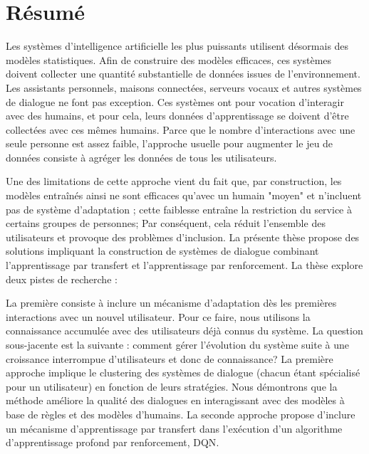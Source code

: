 \newpage

\section*{Résumé}

Les systèmes d'intelligence artificielle les plus puissants utilisent désormais des modèles statistiques. Afin de construire des modèles efficaces, ces systèmes doivent collecter une quantité substantielle de données issues de l’environnement. Les assistants personnels, maisons connectées, serveurs vocaux et autres systèmes de dialogue ne font pas exception. Ces systèmes ont pour vocation d'interagir avec des humains, et pour cela, leurs données d'apprentissage se doivent d'être collectées avec ces mêmes humains. Parce que le nombre d'interactions avec une seule personne est assez faible, l'approche usuelle pour augmenter le jeu de données consiste à agréger les données de tous les utilisateurs.

Une des limitations de cette approche vient du fait que, par construction, les modèles entraînés ainsi ne sont efficaces qu'avec un humain "moyen" et n'incluent pas de système d'adaptation ; cette faiblesse entraîne la restriction du service à certains groupes de personnes; Par conséquent, cela réduit l'ensemble des utilisateurs et provoque des problèmes d'inclusion. La présente thèse propose des solutions impliquant la construction de systèmes de dialogue combinant l'apprentissage par transfert et l'apprentissage par renforcement. La thèse explore deux pistes de recherche :

La première consiste à inclure un mécanisme d'adaptation dès les premières interactions avec un nouvel utilisateur. Pour ce faire, nous utilisons la connaissance accumulée avec des utilisateurs déjà connus du système. La question sous-jacente est la suivante : comment gérer l'évolution du système suite à une croissance interrompue d'utilisateurs et donc de connaissance? La première approche implique le clustering des systèmes de dialogue (chacun étant spécialisé pour un utilisateur) en fonction de leurs stratégies. Nous démontrons que la méthode améliore la qualité des dialogues en interagissant avec des modèles à base de règles et des modèles d'humains. La seconde approche propose d'inclure un mécanisme d'apprentissage par transfert dans l'exécution d'un algorithme d'apprentissage profond par renforcement, \acrlong{DQN}.

